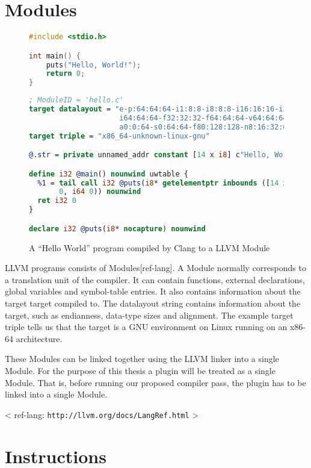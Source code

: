 \section {Modules}

\begin{figure}[ht]
\begin{lstlisting}[language=C]
#include <stdio.h>

int main() {
    puts("Hello, World!");
    return 0;
}
\end{lstlisting}

\begin{lstlisting}[language=llvm]
; ModuleID = 'hello.c'
target datalayout = "e-p:64:64:64-i1:8:8-i8:8:8-i16:16:16-i32:32:32-
                     i64:64:64-f32:32:32-f64:64:64-v64:64:64-v128:128:128-
                     a0:0:64-s0:64:64-f80:128:128-n8:16:32:64-S128"
target triple = "x86_64-unknown-linux-gnu"

@.str = private unnamed_addr constant [14 x i8] c"Hello, World!\00", align 1

define i32 @main() nounwind uwtable {
  %1 = tail call i32 @puts(i8* getelementptr inbounds ([14 x i8]* @.str, i64
       0, i64 0)) nounwind
  ret i32 0
}

declare i32 @puts(i8* nocapture) nounwind
\end{lstlisting}
\caption{A ``Hello World'' program compiled by Clang to a LLVM Module}
\end{figure}

LLVM programs consists of Modules[ref-lang]. A Module normally corresponds to a
translation unit of the compiler. It can contain functions, external
declarations, global variables and symbol-table entries. It also contains
information about the target target compiled to. The datalayout string contains
information about the target, such as endianness, data-type sizes and alignment.
The example target triple tells us that the target is a GNU environment on Linux
running on an x86-64 architecture.

These Modules can be linked together using the LLVM linker into a single Module.
For the purpose of this thesis a plugin will be treated as a single Module. That
is, before running our proposed compiler pass, the plugin has to be linked into
a single Module.

< ref-lang: \texttt{http://llvm.org/docs/LangRef.html} >


\section {Instructions}

